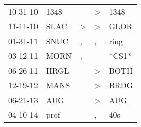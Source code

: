 \begin{supertabular}{p{0.07\textwidth}p{0.06\textwidth}p{0.02\textwidth}p{0.02\textwidth}p{0.06\textwidth}}
 10-31-10\textsuperscript{} &  1348\textsuperscript{} &               &  \textgreater &  1348\textsuperscript{} \\
 11-11-10\textsuperscript{} &  SLAC\textsuperscript{} &  \textgreater &  \textgreater &  GLOR\textsuperscript{} \\
 01-31-11\textsuperscript{} &  SNUC\textsuperscript{} &             , &             , &  ring\textsuperscript{} \\
 03-12-11\textsuperscript{} &  MORN\textsuperscript{} &             , &               &                   *CS1* \\
 06-26-11\textsuperscript{} &  HRGL\textsuperscript{} &               &  \textgreater &  BOTH\textsuperscript{} \\
 12-19-12\textsuperscript{} &  MANS\textsuperscript{} &               &  \textgreater &  BRDG\textsuperscript{} \\
 06-21-13\textsuperscript{} &   AUG\textsuperscript{} &               &  \textgreater &   AUG\textsuperscript{} \\
 04-10-14\textsuperscript{} &  prof\textsuperscript{} &               &             , &   40s\textsuperscript{} \\
\end{supertabular}

